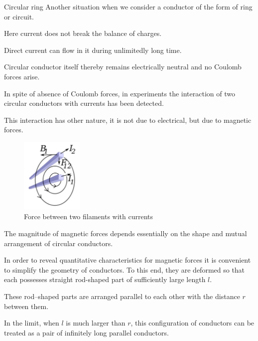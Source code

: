 \documentclass[10pt]{beamer}
\begin{document}
\begin{frame}[fragile]{Circular ring}
Another situation when we consider
a conductor of the form of ring or circuit. 

Here current
does not break the balance of charges. 

Direct current can flow
in it during unlimitedly long time. 

Circular conductor itself
thereby remains electrically neutral and no Coulomb forces
arise.

 In spite of absence of Coulomb forces, in experiments
\alert{the interaction of two circular conductors with currents has been
detected}. 

This interaction has other nature, it is not due 
to electrical, but due to \alert{magnetic forces}. 


\end{frame}
\begin{frame}[fragile]{}
\begin{figure}
\centering
\includegraphics[width=30mm]{FigAmpere.pdf}
\caption{Force between two filaments with currents }
\label{echarges}
\end{figure}


\end{frame}

\begin{frame}[fragile]{}
The \alert{magnitude
of magnetic forces depends essentially on the shape and
mutual arrangement} of circular conductors. 

In order to reveal
quantitative characteristics for magnetic forces it is convenient to simplify the geometry of conductors. To this end,
they are deformed so that each possesses straight rod-shaped
part of sufficiently large length $l$. 

These rod--shaped parts are
arranged parallel to each other with the distance $r$ between
them.

 In the limit, when $l$ is much larger than $r$, this
configuration of conductors can be treated as \alert{a pair of infinitely
long parallel conductors}.

\end{frame}
\end{document}
